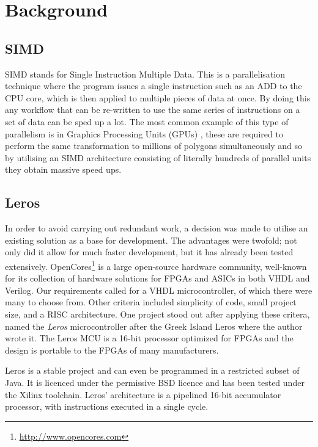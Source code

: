 \section{Background}
\subsection{SIMD}

SIMD stands for Single Instruction Multiple Data.  This is a parallelisation
technique where the program issues a single instruction such as an ADD to the
CPU core, which is then applied to multiple pieces of data at once.  By doing
this any workflow that can be re-written to use the same series of instructions
on a set of data can be sped up a lot.  The most common example of this type of
parallelism is in Graphics Processing Units (GPUs)
\cite{Fatahalian:2008:CLG:1400181.1400197}, these are required to perform the
same transformation to millions of polygons simultaneously and so by utilising
an SIMD architecture consisting of literally hundreds of parallel units they
obtain massive speed ups.


\subsection{Leros}
In order to avoid carrying out redundant work, a decision was made to utilise an
existing solution as a base for development. The advantages were twofold; not
only
did it allow for much faster development, but it has already been tested
extensively.
 OpenCores\footnote{\url{http://www.opencores.com}}
is a large open-source hardware community, well-known for its collection of
hardware solutions for
FPGAs and ASICs in both VHDL and Verilog. Our requirements called for a VHDL
microcontroller, of which there were many to choose from. Other criteria
included
simplicity of code, small project size, and a RISC architecture. One project
stood out
after applying these critera, named the \emph{Leros} microcontroller after the
Greek Island Leros \cite{schoeberlleros} where the author wrote it.  The Leros
MCU is a 16-bit
processor optimized for FPGAs \cite{schoeberlleros} and the design is portable
to the FPGAs of many manufacturers.

Leros is a stable
project and can even be programmed in a restricted subset of Java. It is
licenced
under the permissive BSD licence and has been tested under the Xilinx toolchain.
Leros' architecture is a pipelined 16-bit accumulator
processor\cite{schoeberlleros},
with instructions executed in a single cycle.

